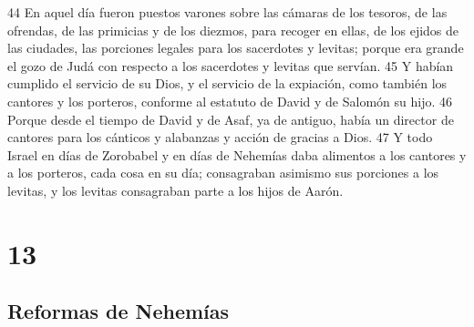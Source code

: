 44 En aquel día fueron puestos varones sobre las cámaras de los tesoros, de las ofrendas, de las primicias y de los diezmos, para recoger en ellas, de los ejidos de las ciudades, las porciones legales para los sacerdotes y levitas; porque era grande el gozo de Judá con respecto a los sacerdotes y levitas que servían.
45 Y habían cumplido el servicio de su Dios, y el servicio de la expiación, como también los cantores y los porteros, conforme al estatuto de David y de Salomón su hijo.
46 Porque desde el tiempo de David y de Asaf, ya de antiguo, había un director de cantores para los cánticos y alabanzas y acción de gracias a Dios.
47 Y todo Israel en días de Zorobabel y en días de Nehemías daba alimentos a los cantores y a los porteros, cada cosa en su día; consagraban asimismo sus porciones a los levitas, y los levitas consagraban parte a los hijos de Aarón.

\chapter{13}

\section*{Reformas de Nehemías}

